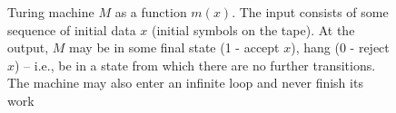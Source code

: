\begin{figure}
\centering



\caption{Turing machine $M$ as a function $m(x)$. The input consists of some sequence of initial data $x$ (initial symbols on the tape).
At the output, $M$ may be in some final state
(1 - accept $x$), hang (0 - reject $x$) – i.e., be in
a state from which there are no further transitions. The machine may also
enter an infinite loop and never finish its work} 
\label{figAddAlgoDecidability}
\end{figure}